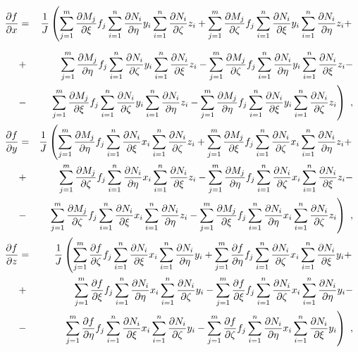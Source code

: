 \begin{eqnarray}\nonumber
\ppd{f}{x} &=& \del{1}{J}\left(
\sum_{j=1}^{m}\ppd{M_j}{\xi}f_j \sum_{i=1}^{n}\ppd{N_i}{\eta}y_i \sum_{i=1}^{n}\ppd{N_i}{\zeta}z_i +
\sum_{j=1}^{m}\ppd{M_j}{\zeta}f_j \sum_{i=1}^{n}\ppd{N_i}{\xi}y_i \sum_{i=1}^{n}\ppd{N_i}{\eta}z_i +\right.
\\[2mm] \nonumber &+&
\sum_{j=1}^{m}\ppd{M_j}{\eta}f_j \sum_{i=1}^{n}\ppd{N_i}{\zeta}y_i \sum_{i=1}^{n}\ppd{N_i}{\xi}z_i -
\sum_{j=1}^{m}\ppd{M_j}{\zeta}f_j \sum_{i=1}^{n}\ppd{N_i}{\eta}y_i \sum_{i=1}^{n}\ppd{N_i}{\xi}z_i -
\\ &-& \left.
\sum_{j=1}^{m}\ppd{M_j}{\xi}f_j \sum_{i=1}^{n}\ppd{N_i}{\zeta}y_i \sum_{i=1}^{n}\ppd{N_i}{\eta}z_i -
\sum_{j=1}^{m}\ppd{M_j}{\eta}f_j \sum_{i=1}^{n}\ppd{N_i}{\xi}y_i \sum_{i=1}^{n}\ppd{N_i}{\zeta}z_i
\right)\ ,
\\ \nonumber
\ppd{f}{y} &=& \del{1}{J}\left(
\sum_{j=1}^{m}\ppd{M_j}{\eta}f_j \sum_{i=1}^{n}\ppd{N_i}{\xi}x_i \sum_{i=1}^{n}\ppd{N_i}{\zeta}z_i +
\sum_{j=1}^{m}\ppd{M_j}{\xi}f_j \sum_{i=1}^{n}\ppd{N_i}{\zeta}x_i \sum_{i=1}^{n}\ppd{N_i}{\eta}z_i +\right.
\\ &+& \nonumber
\sum_{j=1}^{m}\ppd{M_j}{\zeta}f_j \sum_{i=1}^{n}\ppd{N_i}{\eta}x_i \sum_{i=1}^{n}\ppd{N_i}{\xi}z_i -
\sum_{j=1}^{m}\ppd{M_j}{\eta}f_j \sum_{i=1}^{n}\ppd{N_i}{\zeta}x_i \sum_{i=1}^{n}\ppd{N_i}{\xi}z_i -
\\ &-& \left.
\sum_{j=1}^{m}\ppd{M_j}{\zeta}f_j \sum_{i=1}^{n}\ppd{N_i}{\xi}x_i \sum_{i=1}^{n}\ppd{N_i}{\eta}z_i -
\sum_{j=1}^{m}\ppd{M_j}{\xi}f_j \sum_{i=1}^{n}\ppd{N_i}{\eta}x_i \sum_{i=1}^{n}\ppd{N_i}{\zeta}z_i
\right)\ ,
\\ \nonumber
\ppd{f}{z} &=& \del{1}{J}\left(
\sum_{j=1}^{m}\ppd{f}{\zeta}f_j \sum_{i=1}^{n}\ppd{N_i}{\xi}x_i \sum_{i=1}^{n}\ppd{N_i}{\eta}y_i +
\sum_{j=1}^{m}\ppd{f}{\eta}f_j \sum_{i=1}^{n}\ppd{N_i}{\zeta}x_i \sum_{i=1}^{n}\ppd{N_i}{\xi}y_i +\right.
\\ &+& \nonumber
\sum_{j=1}^{m}\ppd{f}{\xi}f_j \sum_{i=1}^{n}\ppd{N_i}{\eta}x_i \sum_{i=1}^{n}\ppd{N_i}{\zeta}y_i -
\sum_{j=1}^{m}\ppd{f}{\xi}f_j \sum_{i=1}^{n}\ppd{N_i}{\zeta}x_i \sum_{i=1}^{n}\ppd{N_i}{\eta}y_i -
\\ &-& \left.
\sum_{j=1}^{m}\ppd{f}{\eta}f_j \sum_{i=1}^{n}\ppd{N_i}{\xi}x_i \sum_{i=1}^{n}\ppd{N_i}{\zeta}y_i -
\sum_{j=1}^{m}\ppd{f}{\zeta}f_j \sum_{i=1}^{n}\ppd{N_i}{\eta}x_i \sum_{i=1}^{n}\ppd{N_i}{\xi}y_i
\right)\ ,
\end{eqnarray}
